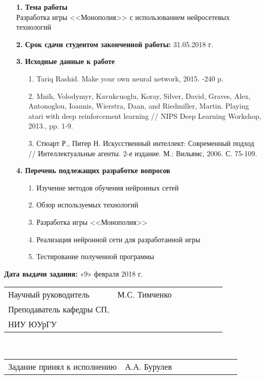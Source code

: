 \begin{article}
\Large{
\begin{enumerate}
    \item[\textbf{1.}] \textbf{Тема работы}\\
    Разработка игры <<Монополия>> с использованием нейросетевых технологий
    \item[\textbf{2.}] \textbf{Срок сдачи студентом законченной работы:} 31.05.2018 г.
    \item[\textbf{3.}] \textbf{Исходные данные к работе}
    \begin{enumerate}
        \item [1.] Tariq Rashid. Make your own neural network, 2015. -240 p.
        \item [2.] Mnih, Volodymyr, Kavukcuoglu, Koray, Silver, David, Graves, Alex, Antonoglou, Ioannis, Wierstra, Daan, and Riedmiller, Martin. Playing atari with deep reinforcement learning // NIPS Deep Learning Workshop, 2013., pp. 1-9.
        \item [3.] Стюарт Р., Питер Н. Искусственный интеллект: Современный подход // Интеллектуальные агенты. 2-е издание. М.: Вильямс, 2006. С. 75-109.
    \end{enumerate}
    \item[\textbf{4.}] \textbf{Перечень подлежащих разработке вопросов}
    \begin{enumerate}
        \item [1.] Изучение методов обучения нейронных сетей
        \item [2.] Обзор используемых технологий
        \item [3.] Разработка игры <<Монополия>>
        \item [4.] Реализация нейронной сети для разработанной игры
        \item [5.] Тестирование полученной программы
    \end{enumerate}
\end{enumerate}
}
\textbf{Дата выдачи задания:} «9» февраля 2018 г.\\

\begin{onehalfspace}
\Large
\begin{tabular}{l{0.5\linewidth}l{0.5\linewidth}}
Научный руководитель \hspace*{5cm}& М.С. Тимченко \\
Преподаватель кафедры СП, \hspace{2cm}& \\
НИУ ЮУрГУ \hspace{2cm}& \\
\end{tabular}\
\end{onehalfspace}
\vspace{1cm}
\begin{onehalfspace}
\Large
\begin{tabular}{l{0.5\linewidth}l{0.5\linewidth}}
Задание принял к исполнению \hspace*{4.5cm}& А.А. Бурулев \\
\end{tabular}\
\end{onehalfspace}

\end{article} 
